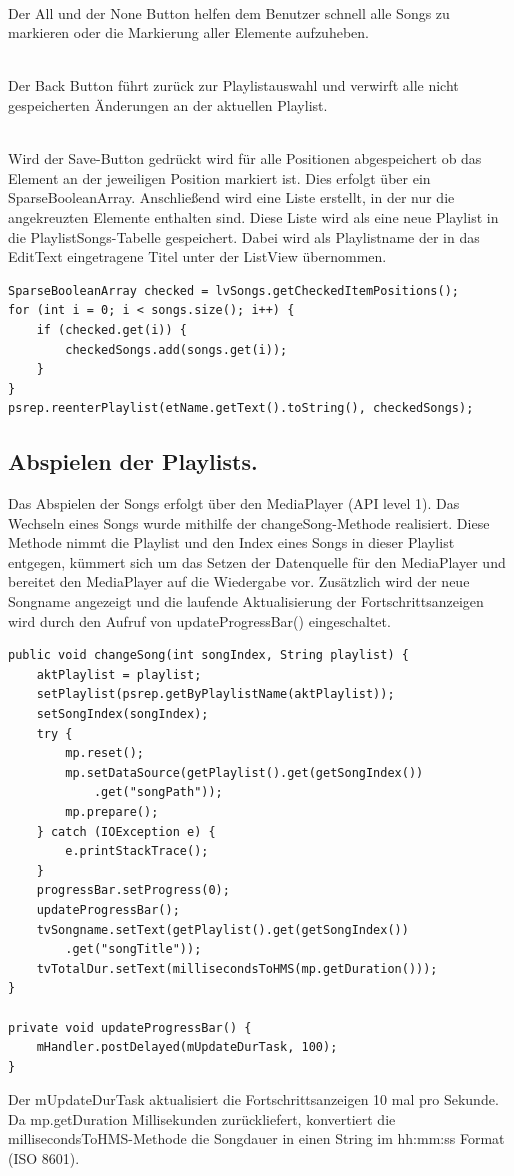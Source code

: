 \documentclass[FIPLY_base.tex]{subfiles}
\begin{document}
\ \\
Der All und der None Button helfen dem Benutzer schnell alle Songs zu markieren oder die Markierung aller Elemente aufzuheben.

\ \\
Der Back Button führt zurück zur Playlistauswahl und verwirft alle nicht gespeicherten Änderungen an der aktuellen Playlist.

\ \\
Wird der Save-Button gedrückt wird für alle Positionen abgespeichert ob das Element an der jeweiligen Position markiert ist. Dies erfolgt über ein SparseBooleanArray. 
Anschließend wird eine Liste erstellt, in der nur die angekreuzten Elemente enthalten sind. Diese Liste wird als eine neue Playlist in die PlaylistSongs-Tabelle gespeichert. 
Dabei wird als Playlistname der in das EditText eingetragene Titel unter der ListView übernommen.

\begin{lstlisting}
SparseBooleanArray checked = lvSongs.getCheckedItemPositions();
for (int i = 0; i < songs.size(); i++) {
    if (checked.get(i)) {
        checkedSongs.add(songs.get(i));
    }
}
psrep.reenterPlaylist(etName.getText().toString(), checkedSongs);
\end{lstlisting}



\newpage
\subsection {Abspielen der Playlists.}
Das Abspielen der Songs erfolgt über den MediaPlayer (API level 1). \newline
Das Wechseln eines Songs wurde mithilfe der changeSong-Methode realisiert. \newline
Diese Methode nimmt die Playlist und den Index eines Songs in dieser Playlist entgegen, kümmert sich um das Setzen der Datenquelle für den MediaPlayer und bereitet den MediaPlayer auf die Wiedergabe vor. 
Zusätzlich wird der neue Songname angezeigt und die laufende Aktualisierung der Fortschrittsanzeigen wird durch den Aufruf von updateProgressBar() eingeschaltet. 

\begin{lstlisting}
public void changeSong(int songIndex, String playlist) {
    aktPlaylist = playlist;
    setPlaylist(psrep.getByPlaylistName(aktPlaylist));
    setSongIndex(songIndex);
    try {
        mp.reset();
        mp.setDataSource(getPlaylist().get(getSongIndex())
        	.get("songPath"));
        mp.prepare();
    } catch (IOException e) {
        e.printStackTrace();
    }
    progressBar.setProgress(0);
    updateProgressBar();
    tvSongname.setText(getPlaylist().get(getSongIndex())
    	.get("songTitle"));
    tvTotalDur.setText(millisecondsToHMS(mp.getDuration()));
}

private void updateProgressBar() {
    mHandler.postDelayed(mUpdateDurTask, 100);
}
\end{lstlisting}
Der mUpdateDurTask aktualisiert die Fortschrittsanzeigen 10 mal pro Sekunde.
Da mp.getDuration Millisekunden zurückliefert, konvertiert die millisecondsToHMS-Methode die Songdauer in einen String im hh:mm:ss Format (ISO 8601).
\end{document}
